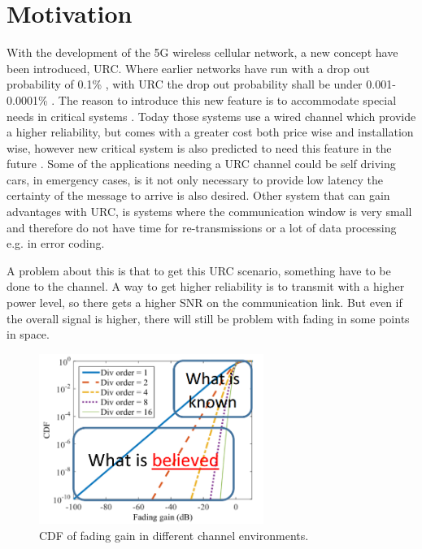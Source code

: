 \section{Motivation}
With the development of the 5G wireless cellular network, a new concept have been introduced, \gls{URC}.  Where earlier networks have run with a drop out probability of 0.1\% , with URC the drop out probability shall be under 0.001-0.0001\% . The reason to introduce this new feature is to accommodate special needs in critical systems . Today those systems use a wired channel which provide a higher reliability, but comes with a greater cost both price wise and installation wise, however new critical system is also predicted to need this feature in the future . %
Some of the applications needing a URC channel could be self driving cars, in emergency cases, is it not only necessary to provide low latency the certainty of the message to arrive is also desired. %
Other system that can gain advantages with URC, is systems where the communication window is very small and therefore do not have time for re-transmissions or a lot of data processing e.g. in error coding.


A problem about this is that to get this URC scenario, something have to be done to the channel. A way to get higher reliability is to transmit with a higher power level, so there gets a higher \gls{SNR} on the communication link. But even if the overall signal is higher, there will still be problem with fading in some points in space. 


\begin{figure}[H]
\centering
\includegraphics[width=0.65\textwidth]{figures/fading_gain.png}
\caption{\gls{CDF} of fading gain in different channel environments.}
\label{fading_gain}
\end{figure}


